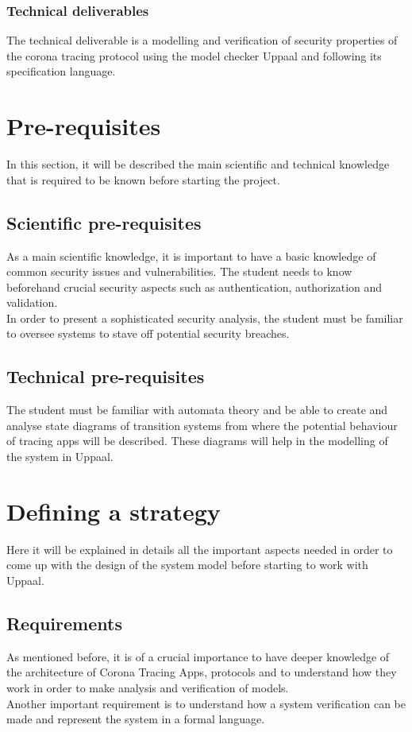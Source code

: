 \documentclass[a4paper, twocolumn]{article}
\begin{document}
\subsubsection{Technical deliverables}
The technical deliverable is a modelling and verification of security properties of the corona tracing protocol using the model checker Uppaal and following its specification language.


\section{Pre-requisites} 
In this section, it will be described the main scientific and technical knowledge that is required to be known before starting the project.

\subsection{Scientific pre-requisites}
As a main scientific knowledge, it is important to have a basic knowledge of common security issues and vulnerabilities. The student needs to know beforehand crucial security aspects such as authentication, authorization and validation.\\
In order to present a sophisticated security analysis, the student must be familiar to oversee systems to stave off potential security breaches. 

\subsection{Technical pre-requisites}
The student must be familiar with automata theory and be able to create and analyse state diagrams of transition systems from where the potential behaviour of tracing apps will be described. These diagrams will help in the modelling of the system in Uppaal.

\section{Defining a strategy}%
Here it will be explained in details all the important aspects needed in order to come up with the design of the system model before starting to work with Uppaal.
\label{sec-production}

\subsection{Requirements}
As mentioned before, it is of a crucial importance to have deeper knowledge of the architecture of Corona Tracing Apps, protocols and to understand how they work in order to make analysis and verification of models.\\
Another important requirement is to understand how a system verification can be made and represent the system in a formal language.
\end{document}

